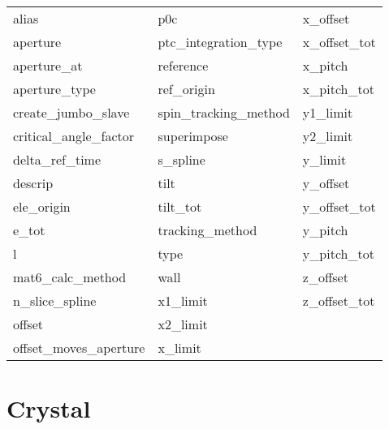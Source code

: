  \begin{tabular}{lll} \toprule
alias                       & p0c                         & x_offset                    \\
aperture                    & ptc_integration_type        & x_offset_tot                \\
aperture_at                 & reference                   & x_pitch                     \\
aperture_type               & ref_origin                  & x_pitch_tot                 \\
create_jumbo_slave          & spin_tracking_method        & y1_limit                    \\
critical_angle_factor       & superimpose                 & y2_limit                    \\
delta_ref_time              & s_spline                    & y_limit                     \\
descrip                     & tilt                        & y_offset                    \\
ele_origin                  & tilt_tot                    & y_offset_tot                \\
e_tot                       & tracking_method             & y_pitch                     \\
l                           & type                        & y_pitch_tot                 \\
mat6_calc_method            & wall                        & z_offset                    \\
n_slice_spline              & x1_limit                    & z_offset_tot                \\
offset                      & x2_limit                    &                             \\
offset_moves_aperture       & x_limit                     &                             \\
 \bottomrule
 \end{tabular}
 \vfill
 
 \section{Crystal}
 \label{s:list.crystal}
 
